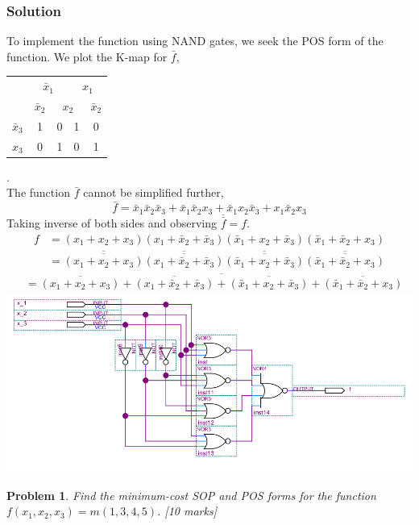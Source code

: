 \documentclass{article}
\newtheorem{prob}{Problem}
\newcommand{\bx}{\bar{x}}
\begin{document}
\subsubsection*{Solution}
To implement the function using NAND gates, we seek the POS form of the
function. We plot the K-map for $\bar{f}$,
\\
\begin{tabular}{c|c|c|c|c}
  \toprule
  & \multicolumn{2}{c|}{$\bx_1$} & \multicolumn{2}{c}{$x_1$}
  \\
  & $\bx_2$ & \multicolumn{2}{c|}{$x_2$} & $\bx_2$
  \\ \midrule
  $\bx_3$
  & 1 & 0 & 1 & 0
  \\
  $x_3$
  & 0 & 1 & 0 & 1
  \\\bottomrule
\end{tabular}.
\\
The function $\bar{f}$ cannot be simplified further,
\[
  \bar{f} = \bx_1 \bx_2 \bx_3  + \bx_1 \bx_2 x_3  + \bx_1 x_2 \bx_3 + x_1 \bx_2 x_3
\]
Taking inverse of both sides and observing $\overline{\bar{f}} = f$.
{\tiny
\begin{align*}
  f &= (x_1 + x_2 + x_3)(x_1 + \bx_2 + \bx_3)(\bx_1 + x_2 + \bx_3)(\bx_1 + \bx_2 + x_3)
      \\
    &=\overline{\overline{(x_1 + x_2 + x_3)}}\overline{\overline{(x_1 + \bx_2 + \bx_3)}}\overline{\overline{(\bx_1 + x_2 + \bx_3)}}\overline{\overline{(\bx_1 + \bx_2 + x_3)}}
      \end{align*}
}{\tiny
\begin{align*}
  &=\overline{\overline{{(x_1 + x_2 + x_3)}} + {\overline{(x_1 + \bx_2 + \bx_3)}}
  + {\overline{(\bx_1 + x_2 + \bx_3)}} + {\overline{(\bx_1 + \bx_2 + x_3)}}}
\end{align*}
}
\includegraphics[width=\linewidth]{files/hw2p4.png}


\begin{prob}
Find the minimum-cost SOP and POS forms for the function $f(x_1 , x_2 , x_3 ) =
m(1, 3, 4, 5)$. \cite[Prob 2.37]{brown2013fundamentals} [10 marks]
\label{prob:237}
\end{prob}
\end{document}
